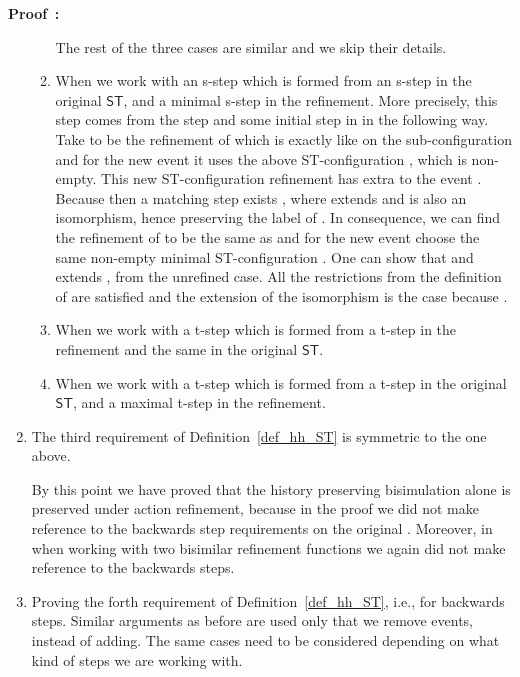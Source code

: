 \documentclass[submission,copyright,creativecommons]{eptcs}
\newenvironment{proof}[1][\!\!\,]{\vspace{1ex}\noindent\textbf{Proof #1: }}{\hfill\vspace{2ex}}
\newcounter{case}
\newcommand\ST{\ensuremath{\mathsf{ST}}}
\begin{document}
\begin{proof}
\begin{enumerate}
\begin{enumerate}
\vspace{1ex}The rest of the three cases are similar and we skip their details.\vspace{1ex}

\item When we work with an s-step which is formed from an s-step in the original \ST, and a minimal s-step in the refinement.
More precisely, this step comes from the step  and some initial step  in  in the following way. Take  to be the refinement of  which is exactly like  on the sub-configuration  and for the new event  it uses the above ST-configuration , which is non-empty. This new ST-configuration refinement has extra to  the event .
Because  then a matching step exists  , where  extends  and is also an isomorphism, hence preserving the label of .
In consequence, we can find the refinement  of  to be the same as  and for the new event  choose the same non-empty minimal ST-configuration .
One can show that  and  extends , from the unrefined case. All the restrictions from the definition of  are satisfied and the extension of the isomorphism is the case because .

\item When we work with a t-step which is formed from a t-step in the refinement and the same  in the original \ST.

\item When we work with a t-step which is formed from a t-step in the original \ST, and a maximal t-step in the refinement.
\end{enumerate}

\item The third requirement of Definition~\ref{def_hh_ST} is symmetric to the one above.

\vspace{1ex}By this point we have proved that the history preserving bisimulation alone is preserved under action refinement, because in the proof we did not make reference to the backwards step requirements on the original . Moreover, in when working with two bisimilar refinement functions we again did not make reference to the backwards steps.

\item Proving the forth requirement of Definition~\ref{def_hh_ST}, i.e., for backwards steps.
Similar arguments as before are used only that we remove events, instead of adding. The same cases need to be considered depending on what kind of steps we are working with.
\end{enumerate}
\end{proof}
\end{document}
